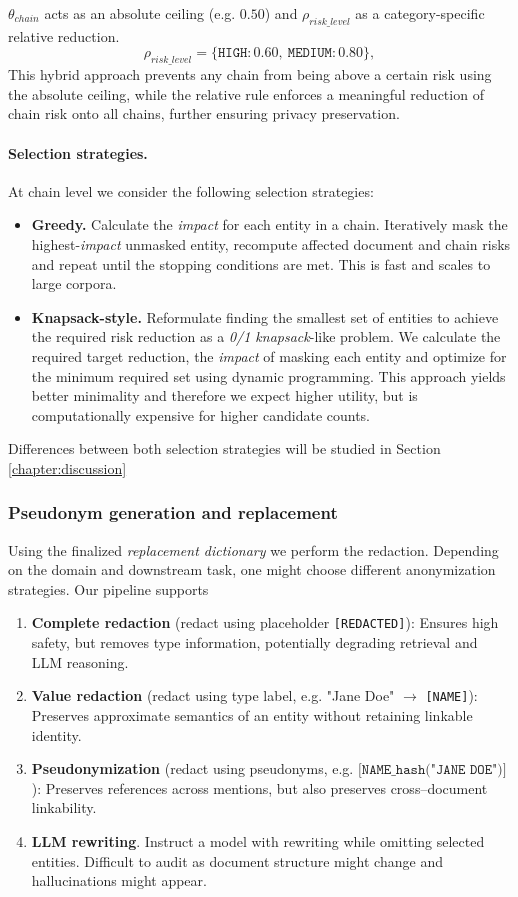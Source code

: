 $\theta_{chain}$ acts as an absolute ceiling (e.g. $0.50$) and $\rho_{risk\_level}$ as a category-specific relative reduction.
\[
    \rho_{risk\_level} = \{\texttt{HIGH}:0.60,\ \texttt{MEDIUM}:0.80\},
\]
This hybrid approach prevents any chain from being above a certain risk using the absolute ceiling, while the relative rule enforces a meaningful reduction of chain risk onto all chains, further ensuring privacy preservation.

\paragraph{Selection strategies.}
At chain level we consider the following selection strategies:
\begin{itemize}
    \item \textbf{Greedy.} Calculate the \textit{impact} for each entity in a chain. Iteratively mask the highest-\textit{impact} unmasked entity, recompute affected document and chain risks and repeat until the stopping conditions are met. This is fast and scales to large corpora.
    \item \textbf{Knapsack-style.} Reformulate finding the smallest set of entities to achieve the required risk reduction as a \textit{0/1 knapsack}-like problem. We calculate the required target reduction, the \textit{impact} of masking each entity and optimize for the minimum required set using dynamic programming. This approach yields better minimality and therefore we expect higher utility, but is computationally expensive for higher candidate counts.
\end{itemize}
Differences between both selection strategies will be studied in Section \ref{chapter:discussion} %

\subsubsection{Pseudonym generation and replacement}
Using the finalized \textit{replacement dictionary} we perform the redaction. Depending on the domain and downstream task, one might choose different anonymization strategies. Our pipeline supports
\begin{enumerate}
    \item \textbf{Complete redaction} (redact using placeholder \texttt{[REDACTED]}): Ensures high safety, but removes type information, potentially degrading retrieval and LLM reasoning.
    \item \textbf{Value redaction} (redact using type label, e.g. "Jane Doe" $\rightarrow$ \texttt{[NAME]}): Preserves approximate semantics of an entity without retaining linkable identity.
    \item \textbf{Pseudonymization} (redact using pseudonyms, e.g. $\texttt{[NAME\_{hash}("JANE DOE")]}$): Preserves references across mentions, but also preserves cross–document linkability.
    \item \textbf{LLM rewriting}. Instruct a model with rewriting while omitting selected entities. Difficult to audit as document structure might change and hallucinations might appear.
\end{enumerate}

